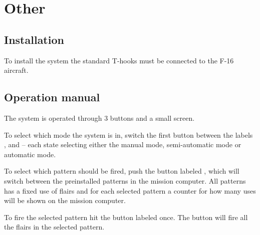 \documentclass[Main]{subfiles}
\begin{document}
\chapter{Other}

\section{Installation}
To install the system the standard T-hooks must be connected to the F-16 aircraft.




\section{Operation manual}
The system is operated through 3 buttons and a small screen.

To select which mode the system is in, switch the first button between the labels ,  and  -- each state selecting either the manual mode, semi-automatic mode or automatic mode.

To select which pattern should be fired, push the button labeled , which will switch between the preinstalled patterns in the mission computer.
All patterns has a fixed use of flairs and for each selected pattern a counter for how many uses will be shown on the mission computer.

To fire the selected pattern hit the button labeled  once.
The button will fire all the flairs in the selected pattern.
\end{document}
